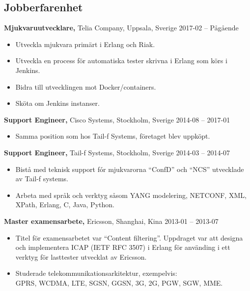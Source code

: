 \documentclass[margin]{res}
\begin{document}

\address{{\bf Kontaktinformation}\\
  
  linkedin.com/in/tommymattsson \\
  github.com/Taddic
}

\address{{\bf Adress}\\
  \\
}

\begin{resume}

\section{Jobberfarenhet}
{\bf Mjukvaruutvecklare,} Telia Company, Uppsala, Sverige \hfill 2017-02 -- Pågående
 \begin{itemize} \itemsep -2pt  %
 \item Utveckla mjukvara primärt i Erlang och Riak.
 \item Utveckla en process för automatiska tester skrivna i Erlang som körs i Jenkins.
 \item Bidra till utvecklingen mot Docker/containers.
 \item Sköta om Jenkins instanser.
 \end{itemize}

{\bf Support Engineer,} Cisco Systems, Stockholm, Sverige \hfill 2014-08 -- 2017-01
 \begin{itemize} \itemsep -2pt  %
 \item Samma position som hos Tail-f Systems, företaget blev uppköpt.
 \end{itemize}

{\bf Support Engineer,} Tail-f Systems, Stockholm, Sverige \hfill 2014-03 -- 2014-07
 \begin{itemize} \itemsep -2pt  %
 \item Bistå med teknisk support fór mjukvarorna ``ConfD'' och ``NCS''
   utvecklade av Tail-f systems.
 \item Arbeta med språk och verktyg såsom YANG modelering, NETCONF,
   XML, XPath, Erlang, C, Java, Python.
 \end{itemize}

{\bf Master examensarbete,} Ericsson, Shanghai, Kina \hfill 2013-01 -- 2013-07
 \begin{itemize} \itemsep -2pt  %
 \item Titel för examensarbetet var ``Content filtering''. Uppdraget var
   att designa och implementera ICAP (IETF RFC 3507) i Erlang för
   använding i ett verktyg för lasttester utvecklat av Ericsson.
 \item Studerade telekommunikationsarkitektur, exempelvis: \\
 GPRS, WCDMA, LTE, SGSN, GGSN, 3G, 2G, PGW, SGW, MME.
 \end{itemize}


\end{resume}
\end{document}
